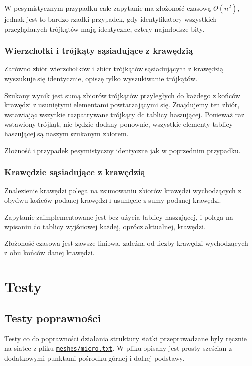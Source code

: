 \documentclass[10pt,a4paper]{article}
\newcommand{\f}[1]{\texttt{#1}}
\newcommand{\rev}{754330aa66a33e7434e6bda5c083aa3e12b7b65f}
\newcommand{\revhref}[1] {\href{https://github.com/student-tomasz/aisd-projekt-indywidualny/blob/\rev/#1}{\f{#1}}}
\begin{document}
W pesymistycznym przypadku całe zapytanie ma złożoność czasową $O(n^2)$,
jednak jest to bardzo rzadki przypadek, gdy identyfikatory wszystkich
przeglądanych trójkątów mają identyczne, cztery najmłodsze bity.

\subsubsection{Wierzchołki i trójkąty sąsiadujące z krawędzią}

Zarówno zbiór wierzchołków i zbiór trójkątów sąsiadujących z krawędzią
wyszukuje się identycznie, opiszę tylko wyszukiwanie trójkątów.

Szukany wynik jest sumą zbiorów trójkątów przyległych do każdego z końców
krawędzi z usuniętymi elementami powtarzającymi się. Znajdujemy ten zbiór,
wstawiając wszytkie rozpatrywane trójkąty do tablicy haszującej. Ponieważ raz
wstawiony trójkąt, nie będzie dodany ponownie, wszystkie elementy tablicy
haszującej są naszym szukanym zbiorem.

Złożność i przypadek pesymistyczny identyczne jak w poprzednim przypadku.

\subsubsection{Krawędzie sąsiadujące z krawędzią}

Znalezienie krawędzi polega na zsumowaniu zbiorów krawędzi wychodzących z
obydwu końców podanej krawędzi i usunięcie z sumy podanej krawędzi.

Zapytanie zaimplementowane jest bez użycia tablicy haszującej, i polega na
wpisaniu do tablicy wyjściowej każdej, oprócz aktualnej, krawędzi.

Złożoność czasowa jest zawsze liniowa, zależna od liczby krawędzi wychodzących
z obu końców danej krawędzi.



\section{Testy}


\subsection{Testy poprawności}

Testy co do poprawności działania struktury siatki przeprowadzane były ręcznie
na siatce z pliku \revhref{meshes/micro.txt}. W pliku opisany jest prosty
sześcian z dodatkowymi punktami pośrodku górnej i dolnej podstawy.
\end{document}
